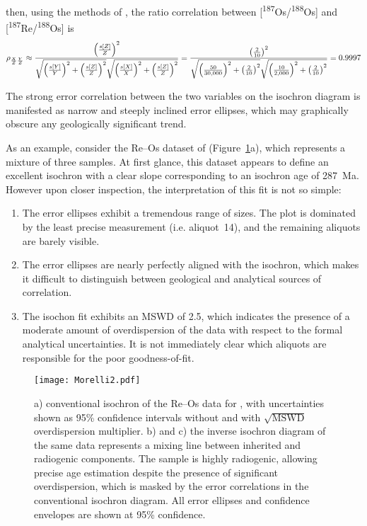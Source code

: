 \documentclass[]{article}
\begin{document}
\noindent then, using the methods of \citet{pearson1896}, the ratio
correlation between [\textsuperscript{187}Os/\textsuperscript{188}Os]
and [\textsuperscript{187}Re/\textsuperscript{188}Os] is
\begin{equation}
  \noindent \rho_{\frac{X}{Z}\frac{Y}{Z}} \approx
  \frac{
    \left(\frac{s[Z]}{Z}\right)^2
  }{
    \sqrt{\left(\frac{s[Y]}{Y}\right)^2 +
      \left(\frac{s[Z]}{Z}\right)^2}
    \sqrt{\left(\frac{s[X]}{X}\right)^2 +
      \left(\frac{s[Z]}{Z}\right)^2}
  }
  =
  \frac{
    \left(\frac{2}{10}\right)^2
  }{
    \sqrt{\left(\frac{50}{30,000}\right)^2 +
      \left(\frac{2}{10}\right)^2}
    \sqrt{\left(\frac{10}{2,000}\right)^2 +
      \left(\frac{2}{10}\right)^2}
  }
  = 0.9997
  \label{eq:spurious-conventional}
\end{equation}

The strong error correlation between the two variables on the isochron
diagram is manifested as narrow and steeply inclined error ellipses,
which may graphically obscure any geologically significant trend.

As an example, consider the Re--Os dataset of \citet{morelli2007}
(Figure~\ref{fig:Morelli}a), which represents a mixture of three
samples. At first glance, this dataset appears to define an excellent
isochron with a clear slope corresponding to an isochron age of
287~Ma. However upon closer inspection, the interpretation of this fit
is not so simple:

\begin{enumerate}
\item The error ellipses exhibit a tremendous range of sizes. The plot
  is dominated by the least precise measurement (i.e. aliquot~14), and
  the remaining aliquots are barely visible.
\item The error ellipses are nearly perfectly aligned with the
  isochron, which makes it difficult to distinguish between geological
  and analytical sources of correlation.
\item The isochon fit exhibits an MSWD of 2.5, which indicates the
  presence of a moderate amount of overdispersion of the data with
  respect to the formal analytical uncertainties. It is not
  immediately clear which aliquots are responsible for the poor
  goodness-of-fit.
\end{enumerate}

\begin{figure}
  \texttt{[image: Morelli2.pdf]}
  \caption{a) conventional isochron of the Re--Os data for
    \citet{morelli2007}, with uncertainties shown as 95\% confidence
    intervals without and with $\sqrt{\mbox{MSWD}}$ overdispersion
    multiplier. b) and c) the inverse isochron diagram of the same
    data represents a mixing line between inherited and radiogenic
    components. The sample is highly radiogenic, allowing precise age
    estimation despite the presence of significant overdispersion,
    which is masked by the error correlations in the conventional
    isochron diagram. All error ellipses and confidence envelopes are
    shown at 95\% confidence.}
  \label{fig:Morelli}
\end{figure}
\end{document}
